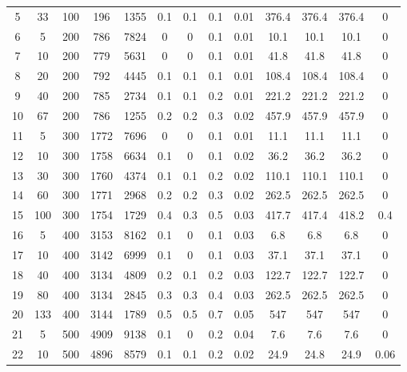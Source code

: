 \documentclass[11pt]{article}
\begin{document}
\begin{table}[]
{\begin{tabular}{ccccc|cccc|cccc}
			\rowcolor[HTML]{EFEFEF} 
			5  & 33  & 100 & 196   & 1355  & 0.1 & 0.1 & 0.1 & 0.01 & 376.4 & 376.4 & 376.4 & 0    \\
			6  & 5   & 200 & 786   & 7824  & 0   & 0   & 0.1 & 0.01 & 10.1  & 10.1  & 10.1  & 0    \\
			7  & 10  & 200 & 779   & 5631  & 0   & 0   & 0.1 & 0.01 & 41.8  & 41.8  & 41.8  & 0    \\
			8  & 20  & 200 & 792   & 4445  & 0.1 & 0.1 & 0.1 & 0.01 & 108.4 & 108.4 & 108.4 & 0    \\
			9  & 40  & 200 & 785   & 2734  & 0.1 & 0.1 & 0.2 & 0.01 & 221.2 & 221.2 & 221.2 & 0    \\
			10 & 67  & 200 & 786   & 1255  & 0.2 & 0.2 & 0.3 & 0.02 & 457.9 & 457.9 & 457.9 & 0    \\
			\rowcolor[HTML]{EFEFEF} 
			11 & 5   & 300 & 1772  & 7696  & 0   & 0   & 0.1 & 0.01 & 11.1  & 11.1  & 11.1  & 0    \\
			\rowcolor[HTML]{EFEFEF} 
			12 & 10  & 300 & 1758  & 6634  & 0.1 & 0   & 0.1 & 0.02 & 36.2  & 36.2  & 36.2  & 0    \\
			\rowcolor[HTML]{EFEFEF} 
			13 & 30  & 300 & 1760  & 4374  & 0.1 & 0.1 & 0.2 & 0.02 & 110.1 & 110.1 & 110.1 & 0    \\
			\rowcolor[HTML]{EFEFEF} 
			14 & 60  & 300 & 1771  & 2968  & 0.2 & 0.2 & 0.3 & 0.02 & 262.5 & 262.5 & 262.5 & 0    \\
			\rowcolor[HTML]{EFEFEF} 
			15 & 100 & 300 & 1754  & 1729  & 0.4 & 0.3 & 0.5 & 0.03 & 417.7 & 417.4 & 418.2 & 0.4  \\
			16 & 5   & 400 & 3153  & 8162  & 0.1 & 0   & 0.1 & 0.03 & 6.8   & 6.8   & 6.8   & 0    \\
			17 & 10  & 400 & 3142  & 6999  & 0.1 & 0   & 0.1 & 0.03 & 37.1  & 37.1  & 37.1  & 0    \\
			18 & 40  & 400 & 3134  & 4809  & 0.2 & 0.1 & 0.2 & 0.03 & 122.7 & 122.7 & 122.7 & 0    \\
			19 & 80  & 400 & 3134  & 2845  & 0.3 & 0.3 & 0.4 & 0.03 & 262.5 & 262.5 & 262.5 & 0    \\
			20 & 133 & 400 & 3144  & 1789  & 0.5 & 0.5 & 0.7 & 0.05 & 547   & 547   & 547   & 0    \\
			\rowcolor[HTML]{EFEFEF} 
			21 & 5   & 500 & 4909  & 9138  & 0.1 & 0   & 0.2 & 0.04 & 7.6   & 7.6   & 7.6   & 0    \\
			\rowcolor[HTML]{EFEFEF} 
			22 & 10  & 500 & 4896  & 8579  & 0.1 & 0.1 & 0.2 & 0.02 & 24.9  & 24.8  & 24.9  & 0.06 \\

\end{tabular}}
\end{table}
\end{document}
